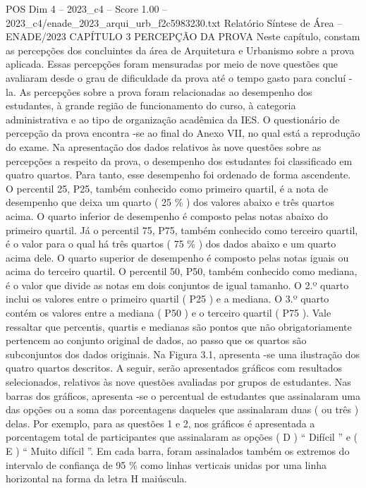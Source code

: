 \begin{textsample}{POS Dim 4 – 2023\_c4 – Score 1.00 – 2023\_c4/enade\_2023\_arqui\_urb\_f2c5983230.txt}  \label{ex:f4_pos_172}
Relatório Síntese de Área – ENADE/2023 CAPÍTULO 3 PERCEPÇÃO DA PROVA Neste capítulo, constam as percepções dos concluintes da área de Arquitetura e Urbanismo sobre a prova aplicada.
Essas percepções foram mensuradas por meio de nove questões que avaliaram desde o grau de dificuldade da prova até o tempo gasto para concluí -la.
As percepções sobre a prova foram relacionadas ao desempenho dos estudantes, à grande região de funcionamento do curso, à categoria administrativa e ao tipo de organização acadêmica da IES.
O questionário de percepção da prova encontra -se ao final do Anexo VII, no qual está a reprodução do exame.
Na apresentação dos dados relativos às nove questões sobre as percepções a respeito da prova, o desempenho dos estudantes foi classificado em quatro quartos.
Para tanto, esse desempenho foi ordenado de forma ascendente.
O percentil 25, P25, também conhecido como primeiro quartil, é a nota de desempenho que deixa um quarto ( 25 \% ) dos valores abaixo e três quartos acima.
O quarto inferior de desempenho é composto pelas notas abaixo do primeiro quartil.
Já o percentil 75, P75, também conhecido como terceiro quartil, é o valor para o qual há três quartos ( 75 \% ) dos dados abaixo e um quarto acima dele.
O quarto superior de desempenho é composto pelas notas iguais ou acima do terceiro quartil.
O percentil 50, P50, também conhecido como mediana, é o valor que divide as notas em dois conjuntos de igual tamanho.
O 2.º quarto inclui os valores entre o primeiro quartil ( P25 ) e a mediana.
O 3.º quarto contém os valores entre a mediana ( P50 ) e o terceiro quartil ( P75 ).
Vale ressaltar que percentis, quartis e medianas são pontos que não obrigatoriamente pertencem ao conjunto original de dados, ao passo que os quartos são subconjuntos dos dados originais.
Na Figura 3.1, apresenta -se uma ilustração dos quatro quartos descritos.
A seguir, serão apresentados gráficos com resultados selecionados, relativos às nove questões avaliadas por grupos de estudantes.
Nas barras dos gráficos, apresenta -se o percentual de estudantes que assinalaram uma das opções ou a soma das porcentagens daqueles que assinalaram duas ( ou três ) delas.
Por exemplo, para as questões 1 e 2, nos gráficos é apresentada a porcentagem total de participantes que assinalaram as opções ( D ) “ Difícil ” e ( E ) “ Muito difícil ”.
Em cada barra, foram assinalados também os extremos do intervalo de confiança de 95 \% como linhas verticais unidas por uma linha horizontal na forma da letra H maiúscula.

\end{textsample}
